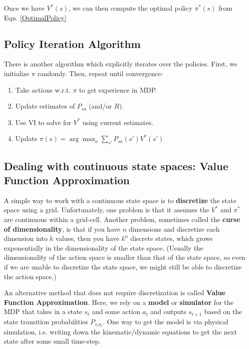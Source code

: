 \documentclass[letterpaper,10pt]{article}
\begin{document}
Once we have $V^*(s)$, we can then compute the optimal policy $\pi^*(s)$ from Eqn. \ref{OptimalPolicy}

\subsection{Policy Iteration Algorithm}

There is another algorithm which explicitly iterates over the policies. First, we initialize $\pi$ randomly. Then, repeat until convergence:

\begin{enumerate}
\item Take actions w.r.t. $\pi$ to get experience in MDP. 
\item Update estimates of $P_{s a}$ (and/or $R$). 
\item Use VI to solve for $V^*$ using current estimates. 
\item Update $\pi(s) = \arg \max_a \sum_{s'} P_{s a} (s') V^*(s')$
\end{enumerate}

\subsection{Dealing with continuous state spaces: Value Function Approximation}

A simple way to work with a continuous state space is to \textbf{discretize} the state space using a grid. Unfortunately, one problem is that it assumes the $V^*$ and $\pi^*$ are continuous within a grid-cell. Another problem, sometimes called the \textbf{curse of dimensionality}, is that if you have $n$ dimensions and discretize each dimension into $k$ values, then you have $k^n$ discrete states, which grows exponentially in the dimensionality of the state space. (Usually the dimensionality of the action space is smaller than that of the state space, so even if we are unable to discretize the state space, we might still be able to discretize the action space.)


An alternative method that does not require discretization is called \textbf{Value Function Approximation}. Here, we rely on a \textbf{model} or \textbf{simulator} for the MDP that takes in a state $s_t$ and some action $a_t$ and outputs $s_{t+1}$ based on the state transition probabilities $P_{s_t a_t}$. One way to get the model is via physical simulation, i.e. writing down the kinematic/dynamic equations to get the next state after some small time-step.
\end{document}
